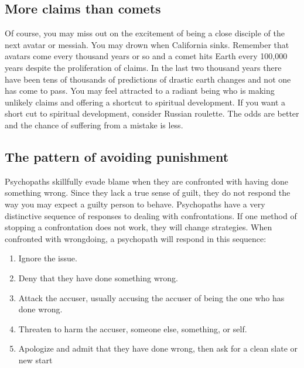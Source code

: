 \documentclass[a5paper,10pt,english]{book}
\begin{document}
\subsection{More claims than comets}
\label{\detokenize{psychopaths:more-claims-than-comets}}
\sphinxAtStartPar
Of course, you may miss out on the excitement of being a close disciple
of the next avatar or messiah. You may drown when California sinks.
Remember that avatars come every thousand years or so and a comet hits
Earth every 100,000 years despite the proliferation of claims. In the
last two thousand years there have been tens of thousands of predictions
of drastic earth changes and not one has come to pass. You may feel
attracted to a radiant being who is making unlikely claims and offering
a shortcut to spiritual development. If you want a short cut to
spiritual development, consider Russian roulette. The odds are better
and the chance of suffering from a mistake is less.


\subsection{The pattern of avoiding punishment}
\label{\detokenize{psychopaths:the-pattern-of-avoiding-punishment}}
\sphinxAtStartPar
Psychopaths skillfully evade blame when they are confronted with having
done something wrong. Since they lack a true sense of guilt, they do not
respond the way you may expect a guilty person to behave. Psychopaths
have a very distinctive sequence of responses to dealing with
confrontations. If one method of stopping a confrontation does not work,
they will change strategies. When confronted with wrong\sphinxhyphen{}doing, a
psychopath will respond in this sequence:
\begin{enumerate}
%
\item {} 
\sphinxAtStartPar
Ignore the issue.

\item {} 
\sphinxAtStartPar
Deny that they have done something wrong.

\item {} 
\sphinxAtStartPar
Attack the accuser, usually accusing the accuser of being the one
who has done wrong.

\item {} 
\sphinxAtStartPar
Threaten to harm the accuser, someone else, something, or self.

\item {} 
\sphinxAtStartPar
Apologize and admit that they have done wrong, then ask for a clean
slate or new start

\end{enumerate}
\end{document}
